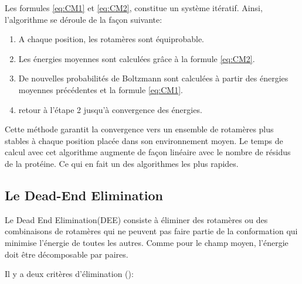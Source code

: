 Les formules \ref{eq:CM1} et \ref{eq:CM2}, constitue un système itératif. Ainsi, l'algorithme se déroule de la façon suivante:


\begin{enumerate}
\item  A chaque position, les rotamères sont équiprobable.
\item  Les énergies moyennes sont calculées grâce à la formule \ref{eq:CM2}.
\item  De nouvelles probabilités de Boltzmann sont calculées à partir des énergies moyennes précédentes et la formule \ref{eq:CM1}.
\item  retour à l'étape 2 jusqu'à convergence des énergies.
\end{enumerate}

Cette méthode garantit la convergence vers un ensemble de rotamères plus stables à chaque position placée dans son \og environnement moyen\fg . Le temps de calcul avec cet algorithme augmente  de façon linéaire avec le nombre de résidus de la protéine. Ce qui en fait un des algorithmes les plus rapides.

\subsection{Le Dead-End Elimination}

Le \og Dead End Elimination\fg (DEE)  consiste à éliminer des rotamères ou des combinaisons de rotamères qui ne peuvent pas faire partie de la conformation qui minimise l'énergie de toutes les autres. Comme pour le champ moyen, l'énergie doit être décomposable par paires.

Il y a deux critères d'élimination (\cite{Desmet92}):

